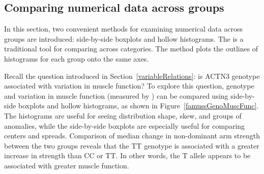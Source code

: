 \begin{doublespace}

\newpage
\subsection{Comparing numerical data across groups}
\label{comparingAcrossGroups}
In this section, two convenient methods for examining numerical data across groups are introduced: side-by-side boxplots and hollow histograms. The   is a traditional tool for comparing across categories. The  method plots the outlines of histograms for each group onto the same axes.

Recall the question introduced in Section~\ref{variableRelations}: is ACTN3 genotype associated with variation in muscle function? To explore this question, genotype and variation in muscle function (measured by ) can be compared using side-by-side boxplots and hollow histograms, as shown in Figure~\ref{famussGenoMuscFunc}. The histograms are useful for seeing distribution shape, skew, and groups of anomalies, while the side-by-side boxplots are especially useful for comparing centers and spreads. Comparison of median change in non-dominant arm strength between the two groups reveals that the TT genotype is associated with a greater increase in strength than CC or TT. In other words, the T allele appears to be associated with greater muscle function.


\end{doublespace}
